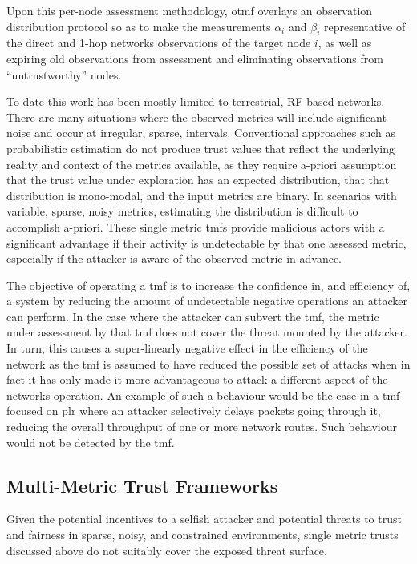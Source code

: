 Upon this per-node assessment methodology, \gls{otmf} overlays an observation distribution protocol so as to make the measurements $\alpha_i$ and $\beta_i$ representative of the direct and 1-hop networks observations of the target node $i$, as well as expiring old observations from assessment and eliminating observations from ``untrustworthy'' nodes.



To date this work has been mostly limited to terrestrial, RF based networks.
There are many situations where the observed metrics will include significant noise and occur at irregular, sparse, intervals.
Conventional approaches such as probabilistic estimation do not produce trust values that reflect the underlying reality and context of the metrics available, as they require a-priori assumption that the trust value under exploration has an expected distribution, that that distribution is mono-modal, and the input metrics are binary.
In scenarios with variable, sparse, noisy metrics, estimating the distribution is difficult to accomplish a-priori.
These single metric \glspl{tmf} provide malicious actors with a significant advantage if their activity is undetectable by that one assessed metric, especially if the attacker is aware of the observed metric in advance.

The objective of operating a \gls{tmf} is to increase the confidence in, and efficiency of, a system by reducing the amount of undetectable negative operations an attacker can perform.
In the case where the attacker can subvert the \gls{tmf}, the metric under assessment by that \gls{tmf} does not cover the threat mounted by the attacker.
In turn, this causes a super-linearly negative effect in the efficiency of the network as the \gls{tmf} is assumed to have reduced the possible set of attacks when in fact it has only made it more advantageous to attack a different aspect of the networks operation.
An example of such a behaviour would be the case in a \gls{tmf} focused on \gls{plr} where an attacker selectively delays packets going through it, reducing the overall throughput of one or more network routes.
Such behaviour would not be detected by the \gls{tmf}.

\subsection{Multi-Metric Trust Frameworks}\label{sec:multimetrictrust}
Given the potential incentives to a selfish attacker and potential threats to trust and fairness in sparse, noisy, and constrained environments, single metric trusts discussed above do not suitably cover the exposed threat surface.


